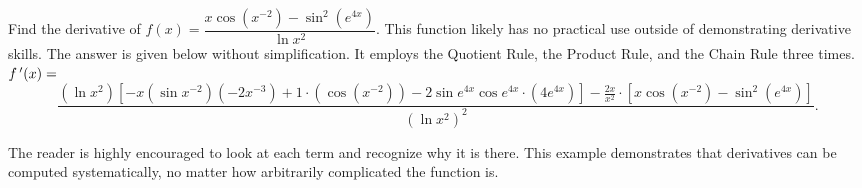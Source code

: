 
\begin{example}\label{ex_chain5}%
Find the derivative of $f(x)=\dfrac{x\cos(x^{-2})-\sin^2(e^{4x})}{\ln x^2}$.
\solution
This function likely has no practical use outside of demonstrating derivative skills. The answer is given below without simplification. It employs the Quotient Rule, the Product Rule, and the Chain Rule three times.\\
\scriptsize
$f\,'(x) = $
\[
 \dfrac{(\ln x^2)[-x(\sin x^{-2})(-2x^{-3}) + 1\cdot (\cos (x^{-2})) -2 \sin e^{4x} \cos e^{4x} \cdot (4e^{4x})] - \frac{2x}{x^2} \cdot [x\cos (x^{-2}) -\sin^2(e^{4x})]}
 {(\ln x^2)^2}.
\]%
\normalsize

The reader is highly encouraged to look at each term and recognize why it is there. %
This example demonstrates that derivatives can be computed systematically, no matter how arbitrarily complicated the function is.
\end{example}

